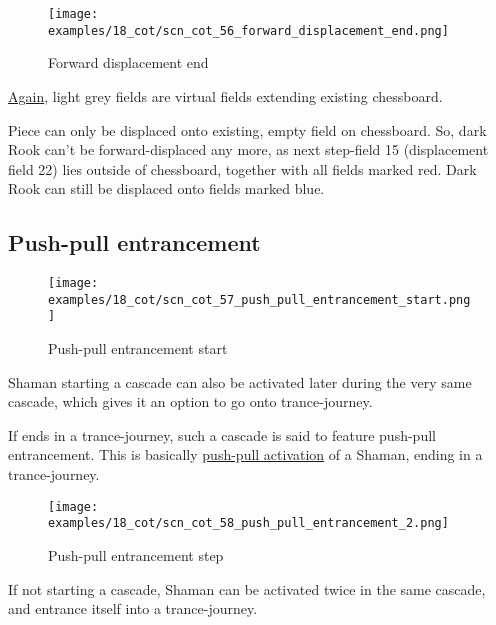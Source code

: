 \noindent
\begin{figure}[!h]
\texttt{[image: examples/18\_cot/scn\_cot\_56\_forward\_displacement\_end.png]}
\caption{Forward displacement end}
\label{fig:scn_cot_56_forward_displacement_end}
\end{figure}

\hyperref[fig:scn_hd_06_centaur_off_board]{Again},
light grey fields are virtual fields extending existing chessboard.

Piece can only be displaced onto existing, empty field on chessboard. So, dark Rook
can't be forward-displaced any more, as next step-field 15 (displacement field 22)
lies outside of chessboard, together with all fields marked red. Dark Rook can still
be displaced onto fields marked blue.

\clearpage %

\subsection*{Push-pull entrancement}
\label{sec:Conquest of Tlalocan/Trance-journey/Push-pull entrancement}

\noindent
\begin{wrapfigure}[9]{l}{0.4\textwidth}
\centering
\texttt{[image: examples/18\_cot/scn\_cot\_57\_push\_pull\_entrancement\_start.png]}
\caption{Push-pull entrancement start}
\label{fig:star/scn_cot_57_push_pull_entrancement_start}
\end{wrapfigure}
Shaman starting a cascade can also be activated later during the very same cascade,
which gives it an option to go onto trance-journey.

If ends in a trance-journey, such a cascade is said to feature push-pull entrancement.
This is basically
\hyperref[sec:Terms/Push-pull activation]{push-pull activation} of a Shaman, ending
in a trance-journey.

\vspace*{0.05\textheight}
\noindent
\begin{wrapfigure}[11]{l}{0.4\textwidth}
\centering
\texttt{[image: examples/18\_cot/scn\_cot\_58\_push\_pull\_entrancement\_2.png]}
\caption{Push-pull entrancement step}
\label{fig:star/scn_cot_58_push_pull_entrancement_2}
\end{wrapfigure}
If not starting a cascade, Shaman can be activated twice in the same cascade, and
entrance itself into a trance-journey.


